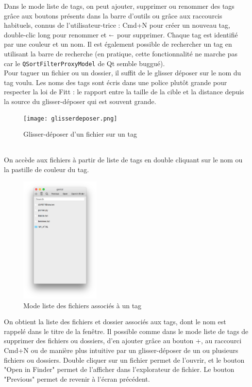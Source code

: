 \documentclass{report}
\begin{document}
    Dans le mode liste de tags, on peut ajouter, supprimer ou renommer des tags grâce aux boutons présents dans la barre d'outils ou grâce aux raccourcis habituels, connus de l'utilisateur-trice : Cmd+N pour créer un nouveau tag, double-clic long pour renommer et $\shortleftarrow$ pour supprimer. Chaque tag est identifié par une couleur et un nom. Il est également possible de rechercher un tag en utilisant la barre de recherche (en pratique, cette fonctionnalité ne marche pas car le \texttt{QSortFilterProxyModel} de Qt semble buggué).\\
    
    Pour taguer un fichier ou un dossier, il suffit de le glisser déposer sur le nom du tag voulu. Les noms des tags sont écris dans une police plutôt grande pour respecter la loi de Fitt : le rapport entre la taille de la cible et la distance depuis la source du glisser-déposer qui est souvent grande.
        \begin{figure}[htbp]
            \begin{center}
            \texttt{[image: glisserdeposer.png]}
            \caption{Glisser-déposer d'un fichier sur un tag}
            \end{center}
        \end{figure}
    \\
    On accède aux fichiers à partir de liste de tags en double cliquant sur le nom ou la pastille de couleur du tag.\\
        \begin{figure}[htbp]
            \begin{center}
            \includegraphics[width=4cm]{listefichiers.png}
            \caption{Mode liste des fichiers associés à un tag}
            \end{center}
        \end{figure}
        
    On obtient la liste des fichiers et dossier associés aux tags, dont le nom est rappelé dans le titre de la fenêtre. Il possible comme dans le mode liste de tags de supprimer des fichiers ou dossiers, d'en ajouter grâce au bouton +, au raccourci Cmd+N ou de manière plus intuitive par un glisser-déposer de un ou plusieurs fichiers ou dossiers. Double cliquer sur un fichier permet de l'ouvrir, et le bouton "Open in Finder" permet de l'afficher dans l'explorateur de fichier. Le bouton "Previous" permet de revenir à l'écran précédent.\\
    
\end{document}
